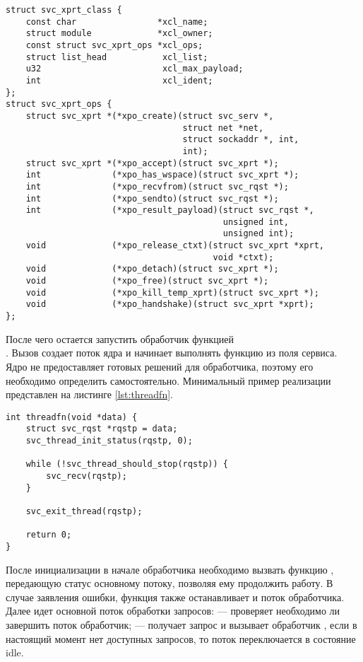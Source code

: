 \begin{lstlisting}[caption={Структура транспортного протокола и операции над ним}, label={lst:struct_svc_xprt_class}]
struct svc_xprt_class {
    const char                *xcl_name;
    struct module             *xcl_owner;
    const struct svc_xprt_ops *xcl_ops;
    struct list_head           xcl_list;
    u32                        xcl_max_payload;
    int                        xcl_ident;
};
struct svc_xprt_ops {
    struct svc_xprt *(*xpo_create)(struct svc_serv *,
                                   struct net *net,
                                   struct sockaddr *, int,
                                   int);
    struct svc_xprt *(*xpo_accept)(struct svc_xprt *);
    int              (*xpo_has_wspace)(struct svc_xprt *);
    int              (*xpo_recvfrom)(struct svc_rqst *);
    int              (*xpo_sendto)(struct svc_rqst *);
    int              (*xpo_result_payload)(struct svc_rqst *,
                                           unsigned int,
                                           unsigned int);
    void             (*xpo_release_ctxt)(struct svc_xprt *xprt,
                                         void *ctxt);
    void             (*xpo_detach)(struct svc_xprt *);
    void             (*xpo_free)(struct svc_xprt *);
    void             (*xpo_kill_temp_xprt)(struct svc_xprt *);
    void             (*xpo_handshake)(struct svc_xprt *xprt);
};
\end{lstlisting}

После чего остается запустить обработчик функцией \\
. Вызов создает поток ядра и начинает выполнять
функцию из поля  сервиса. Ядро не предоставляет готовых
решений для обработчика, поэтому его необходимо определить самостоятельно.
Минимальный пример реализации представлен на листинге \ref{lst:threadfn}.

\begin{lstlisting}[caption={Минимальная реализация функции потока}, label={lst:threadfn}]
int threadfn(void *data) {
    struct svc_rqst *rqstp = data;
    svc_thread_init_status(rqstp, 0);

    while (!svc_thread_should_stop(rqstp)) {
        svc_recv(rqstp);
    }

    svc_exit_thread(rqstp);

    return 0;
}
\end{lstlisting}

После инициализации в начале обработчика необходимо вызвать функцию
, передающую статус основному потоку, позволяя ему
продолжить работу. В случае заявления ошибки, функция также останавливает и
поток обработчика. Далее идет основной поток обработки запросов:
 --- проверяет необходимо ли завершить поток
обработчик;  --- получает запрос и вызывает обработчик
, если в настоящий момент нет доступных запросов, то поток
переключается в состояние idle.

